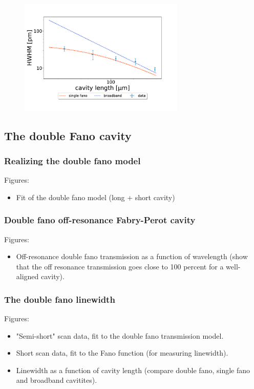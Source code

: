 \begin{figure}[h!]
    \centering
    \includegraphics[width=0.7\textwidth]{figures/HWHM_vs_cavity_length_single_fano.pdf}
    \caption{}
    \label{fig:HWHM_vs_time_single_fano_data}
\end{figure}

\subsection{The double Fano cavity}

\subsubsection{Realizing the double fano model}

Figures: 
\begin{itemize}
    \item Fit of the double fano model (long + short cavity)
\end{itemize}

\subsubsection{Double fano off-resonance Fabry-Perot cavity}

Figures:
\begin{itemize}
    \item Off-resonance double fano transmission as a function of wavelength (show that the off resonance transmission goes close to 100 percent for a well-aligned cavity).
\end{itemize}

\subsubsection{The double fano linewidth}

Figures: 
\begin{itemize}
    \item "Semi-short" scan data, fit to the double fano transmission model. 
    \item Short scan data, fit to the Fano function (for measuring linewidth).
    \item Linewidth as a function of cavity length (compare double fano, single fano and broadband cavitites).
\end{itemize}

